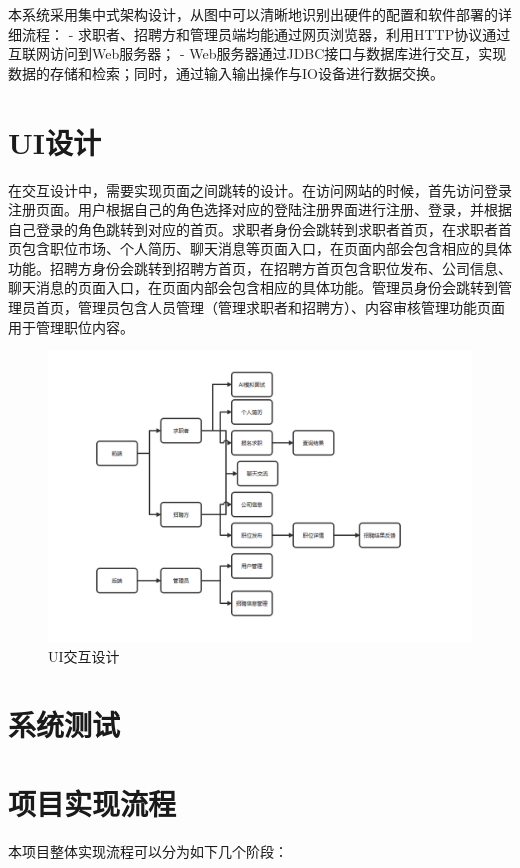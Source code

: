 \documentclass[UTF8,a4paper,10pt]{ctexart}
\begin{document}
本系统采用集中式架构设计，从图中可以清晰地识别出硬件的配置和软件部署的详细流程：
- 求职者、招聘方和管理员端均能通过网页浏览器，利用HTTP协议通过互联网访问到Web服务器；
- Web服务器通过JDBC接口与数据库进行交互，实现数据的存储和检索；同时，通过输入输出操作与IO设备进行数据交换。

\section{UI设计}

在交互设计中，需要实现页面之间跳转的设计。在访问网站的时候，首先访问登录注册页面。用户根据自己的角色选择对应的登陆注册界面进行注册、登录，并根据自己登录的角色跳转到对应的首页。求职者身份会跳转到求职者首页，在求职者首页包含职位市场、个人简历、聊天消息等页面入口，在页面内部会包含相应的具体功能。招聘方身份会跳转到招聘方首页，在招聘方首页包含职位发布、公司信息、聊天消息的页面入口，在页面内部会包含相应的具体功能。管理员身份会跳转到管理员首页，管理员包含人员管理（管理求职者和招聘方）、内容审核管理功能页面用于管理职位内容。

\begin{figure}[H]
    \centering
    \includegraphics[width=\textwidth]{img/UI交互设计.png} 
    \caption{UI交互设计}
    \label{fig:UI交互设计}
\end{figure}

\section{系统测试}


\section{项目实现流程}
本项目整体实现流程可以分为如下几个阶段：
\end{document}

